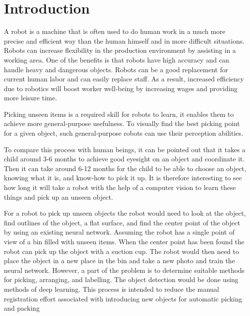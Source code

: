 \chapter{Introduction\label{cha:introduction}}

A robot is a machine that is often used to do human work in a much more precise and efficient way than the human himself and in more difficult situations. Robots can increase flexibility in the production environment by assisting in a working area. One of the benefits is that robots have high accuracy and can handle heavy and dangerous objects. Robots can be a good replacement for current human labor and can easily replace staff. As a result, increased efficiency due to robotics will boost worker well-being by increasing wages and providing more leisure time.

Picking unseen items is a required skill for robots to learn, it enables them to achieve more general-purpose usefulness. To visually find the best picking point for a given object, such general-purpose robots can use their perception abilities.

To compare this process with human beings, it can be pointed out that it takes a child around 3-6 months to achieve good eyesight on an object and coordinate it. Then it can take around 6-12 months for the child to be able to choose an object, knowing what it is, and know-how to pick it up. It is therefore interesting to see how long it will take a robot with the help of a computer vision to learn these things and pick up an unseen object. 

For a robot to pick up unseen objects\cite{xie_unseen_2021} the robot would need to look at the object, find outlines of the object, a flat surface, and find the center point of the object by using an existing neural network. Assuming the robot has a single point of view of a bin filled with unseen items. When the center point has been found the robot can pick up the object with a suction cup. The robot would then need to place the object in a new place in the bin and take a new photo and train the neural network. However, a part of the problem is to determine suitable methods for picking, arranging, and labelling. The object detection would be done using methods of deep learning. This process is intended to reduce the manual registration effort associated with introducing new objects for automatic picking and packing


